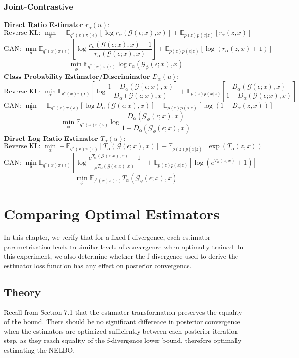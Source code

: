 \documentclass[honours,12pt]{unswthesis}
\newcommand{\E}{\mathbb{E}}
\numberwithin{equation}{section}
\theoremstyle{definition}
\begin{document}
\subsection{Joint-Contrastive}
\textbf{Direct Ratio Estimator} $r_\alpha(u)$:
\[\text{Reverse KL: }\min_\alpha -\E_{q^*(x)\pi(\epsilon)}[\log r_\alpha(\mathcal{G}(\epsilon;x),x)]+\E_{p(z)p(x|z)}[r_\alpha(z,x)]\]
\[\text{GAN: }\min_\alpha \E_{q^*(x)\pi(\epsilon)}\left[\log \frac{r_\alpha(\mathcal{G}(\epsilon;x),x)+1}{r_\alpha(\mathcal{G}(\epsilon;x),x)}\right]+\E_{p(z)p(x|z)}[\log(r_\alpha(z,x)+1)]\]
\[\min_\phi \E_{q^*(x)\pi(\epsilon)}\log r_\alpha(\mathcal{G}_\phi(\epsilon;x),x)\]
\textbf{Class Probability Estimator/Discriminator} $D_\alpha(u)$:
\[\text{Reverse KL: }\min_\alpha \E_{q^*(x)\pi(\epsilon)}\left[\log \frac{1-D_\alpha(\mathcal{G}(\epsilon;x),x)}{D_\alpha(\mathcal{G}(\epsilon;x),x)}\right]+\E_{p(z)p(x|z)}\left[\frac{D_\alpha(\mathcal{G}(\epsilon;x),x)}{1-D_\alpha(\mathcal{G}(\epsilon;x),x)}\right]\]
\[\text{GAN: }\min_\alpha -\E_{q^*(x)\pi(\epsilon)}[\log D_\alpha(\mathcal{G}(\epsilon;x),x)]-\E_{p(z)p(x|z)}[\log(1-D_\alpha(z,x))]\]
\[\min_\phi \E_{q^*(x)\pi(\epsilon)}\log \frac{D_\alpha(\mathcal{G}_\phi(\epsilon;x),x)}{1-D_\alpha(\mathcal{G}_\phi(\epsilon;x),x)}\]
\textbf{Direct Log Ratio Estimator} $T_\alpha(u)$:
\[\text{Reverse KL: }\min_\alpha -\E_{q^*(x)\pi(\epsilon)}[T_\alpha(\mathcal{G}(\epsilon;x),x)]+\E_{p(z)p(x|z)}[\exp(T_\alpha(z,x))]\]
\[\text{GAN: }\min_\alpha \E_{q^*(x)\pi(\epsilon)}\left[\log \frac{e^{T_\alpha(\mathcal{G}(\epsilon;x),x)}+1}{e^{T_\alpha(\mathcal{G}(\epsilon;x),x)}}\right]+\E_{p(z)p(x|z)}[\log(e^{T_\alpha(z,x)}+1)]\]
\[\min_\phi \E_{q^*(x)\pi(\epsilon)}T_\alpha(\mathcal{G}_\phi(\epsilon;x),x)\]
\chapter{Comparing Optimal Estimators}
In this chapter, we verify that for a fixed f-divergence, each estimator parametrisation leads to similar levels of convergence when optimally trained. In this experiment, we also determine whether the f-divergence used to derive the estimator loss function has any effect on posterior convergence.
\section{Theory}
Recall from Section 7.1 that the estimator transformation preserves the equality of the bound. There should be no significant difference in posterior convergence when the estimators are optimized sufficiently between each posterior iteration step, as they reach equality of the f-divergence lower bound, therefore optimally estimating the NELBO.
\end{document}
